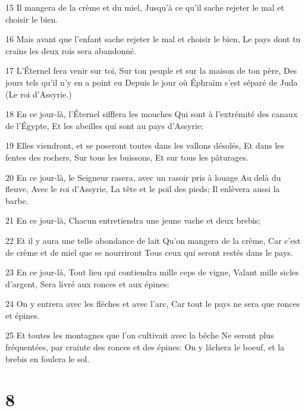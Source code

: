 \par 15 Il mangera de la crème et du miel, Jusqu'à ce qu'il sache rejeter le mal et choisir le bien.
\par 16 Mais avant que l'enfant sache rejeter le mal et choisir le bien, Le pays dont tu crains les deux rois sera abandonné.
\par 17 L'Éternel fera venir sur toi, Sur ton peuple et sur la maison de ton père, Des jours tels qu'il n'y en a point eu Depuis le jour où Éphraïm s'est séparé de Juda (Le roi d'Assyrie.)
\par 18 En ce jour-là, l'Éternel sifflera les mouches Qui sont à l'extrémité des canaux de l'Égypte, Et les abeilles qui sont au pays d'Assyrie;
\par 19 Elles viendront, et se poseront toutes dans les vallons désolés, Et dans les fentes des rochers, Sur tous les buissons, Et sur tous les pâturages.
\par 20 En ce jour-là, le Seigneur rasera, avec un rasoir pris à louage Au delà du fleuve, Avec le roi d'Assyrie, La tête et le poil des pieds; Il enlèvera aussi la barbe.
\par 21 En ce jour-là, Chacun entretiendra une jeune vache et deux brebis;
\par 22 Et il y aura une telle abondance de lait Qu'on mangera de la crème, Car c'est de crème et de miel que se nourriront Tous ceux qui seront restés dans le pays.
\par 23 En ce jour-là, Tout lieu qui contiendra mille ceps de vigne, Valant mille sicles d'argent, Sera livré aux ronces et aux épines:
\par 24 On y entrera avec les flèches et avec l'arc, Car tout le pays ne sera que ronces et épines.
\par 25 Et toutes les montagnes que l'on cultivait avec la bêche Ne seront plus fréquentées, par crainte des ronces et des épines: On y lâchera le boeuf, et la brebis en foulera le sol.

\chapter{8}

